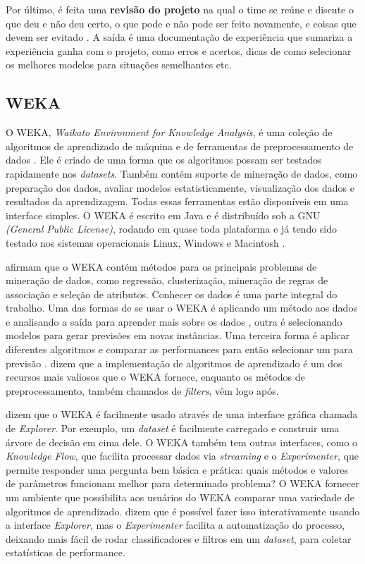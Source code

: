 Por último, é feita uma \textbf{revisão do projeto} na qual o time se reúne e discute o que deu e não deu certo, o que pode e não pode ser feito novamente, e coisas que devem ser evitado \citep{dmfd}.
A saída é uma documentação de experiência que sumariza a experiência ganha com o projeto, como erros e acertos, dicas de como selecionar os melhores modelos para situações semelhantes etc.

\subsection{WEKA}

O WEKA, \textit{Waikato Environment for Knowledge Analysis}, é uma coleção de algoritmos de aprendizado de máquina e de ferramentas de preprocessamento de dados \citep{weka}. Ele é criado de uma forma que os algoritmos possam ser testados rapidamente nos \textit{datasets}. Também contém suporte de mineração de dados, como preparação dos dados, avaliar modelos estatisticamente, visualização dos dados e resultados da aprendizagem. Todas essas ferramentas estão disponíveis em uma interface simples. O WEKA é escrito em Java e é distribuído sob a GNU \textit{(General Public License)}, rodando em quase toda plataforma e já tendo sido testado nos sistemas operacionais Linux, Windows e Macintosh \citep{weka}.

 afirmam que o WEKA contém métodos para os principais problemas de mineração de dados, como regressão, clusterização, mineração de regras de associação e seleção de atributos. Conhecer os dados é uma parte integral do trabalho. Uma das formas de se usar o WEKA é aplicando um método aos dados e analisando a saída para aprender mais sobre os dados \citep{weka}, outra é selecionando modelos para gerar previsões em novas instâncias. Uma terceira forma é aplicar diferentes algoritmos e comparar as performances para então selecionar um para previsão .  dizem que a implementação de algoritmos de aprendizado é um dos recursos mais valiosos que o WEKA fornece, enquanto os métodos de preprocessamento, também chamados de \textit{filters}, vêm logo após. 

 dizem que o WEKA é facilmente usado através de uma interface gráfica chamada de \textit{Explorer}. Por exemplo, um \textit{dataset} é facilmente carregado e construir uma árvore de decisão em cima dele. O WEKA também tem outras interfaces, como o \textit{Knowledge Flow}, que facilita processar dados via \textit{streaming} e o \textit{Experimenter}, que permite responder uma pergunta bem básica e prática: quais métodos e valores de parâmetros funcionam melhor para determinado problema? O WEKA fornecer um ambiente que possibilita aos usuários do WEKA comparar uma variedade de algoritmos de aprendizado.  dizem que é possível fazer isso interativamente usando a  interface \textit{Explorer}, mas o \textit{Experimenter} facilita a automatização do processo, deixando mais fácil de rodar classificadores e filtros em um \textit{dataset}, para coletar estatísticas de performance.

